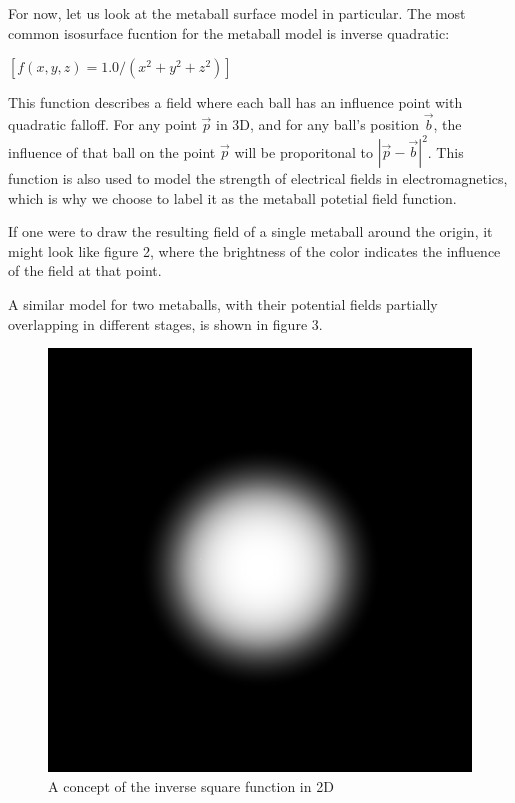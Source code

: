 \documentclass{article}
\begin{document}
\begin{multicols}{2}
            For now, let us look at the metaball surface model in particular. The most common isosurface fucntion for the metaball model is inverse quadratic:

            $[f(x,y,z) = 1.0 / (x^2 + y^2 + z^2)]$

            This function describes a field where each ball has an influence point with quadratic falloff.
            For any point $\vec{p}$ in 3D, and for any ball's position $\vec{b}$, the influence of that ball on the point $\vec{p}$ will be proporitonal to $|\vec{p} - \vec{b}|^2$.
            This function is also used to model the strength of electrical fields in electromagnetics, which is why we choose to label it as the metaball potetial field function.
            \cite{geiss00}

            If one were to draw the resulting field of a single metaball around the origin, it might look like figure 2, where the brightness of the color indicates the influence of the field at that point.
            
            A similar model for two metaballs, with their potential fields partially overlapping in different stages, is shown in figure 3.
            
            \begin{figure}[H]
            	\centering
            	\begin{minipage}[b]{0.2\textwidth}
            		\centering
            		\includegraphics[width=\textwidth]{img/2d-potential.png}
            		\caption{A concept of the inverse square function in 2D}
		            \label{fig:2d-potential}
            	\end{minipage}
            \end{figure}
        

\end{multicols}
\end{document}
